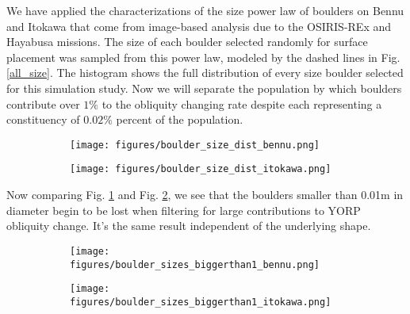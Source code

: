 \documentclass[12pt,notitlepage]{article}
\begin{document}
We have applied the characterizations of the size power law of boulders on Bennu and Itokawa that come from image-based analysis due to the OSIRIS-REx and Hayabusa missions. The size of each boulder selected randomly for surface placement was sampled from this power law, modeled by the dashed lines in Fig. \ref{all_size}. The histogram shows the full distribution of every size boulder selected for this simulation study. Now we will separate the population by which boulders contribute over $1\%$ to the obliquity changing rate despite each representing a constituency of $0.02\%$ percent of the population. 

\begin{figure}[H]
    \begin{subfigure}{0.49\textwidth}
        \centering
        \texttt{[image: figures/boulder\_size\_dist\_bennu.png]}
        \caption{}
    \end{subfigure}
    \hfill
    \begin{subfigure}{0.49\textwidth}
        \centering
        \texttt{[image: figures/boulder\_size\_dist\_itokawa.png]}
        \caption{}
    \end{subfigure}  
    \caption{}
    \label{fig:all_size}
\end{figure}



Now comparing Fig. \ref{fig:all_size} and Fig. \ref{fig:size_onepercent}, we see that the boulders smaller than 0.01m in diameter begin to be lost when filtering for large contributions to YORP obliquity change. It's the same result independent of the underlying shape.
\begin{figure}[H]
    \begin{subfigure}{0.49\textwidth}
        \centering
        \texttt{[image: figures/boulder\_sizes\_biggerthan1\_bennu.png]}
        \caption{}
    \end{subfigure}
    \hfill
    \begin{subfigure}{0.49\textwidth}
        \centering
        \texttt{[image: figures/boulder\_sizes\_biggerthan1\_itokawa.png]}
        \caption{}
    \end{subfigure}  
    \caption{}
    \label{fig:size_onepercent}
\end{figure}
\end{document}
